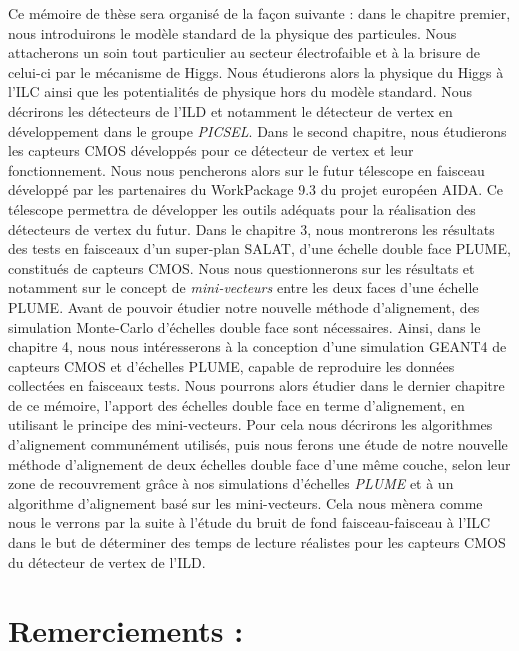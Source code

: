 \documentclass[a4paper,11pt]{report}
\begin{document}
Ce m\'emoire de th\`ese sera organis\'e de la façon suivante : dans le chapitre premier, nous introduirons le mod\`ele standard de la physique des particules. Nous attacherons un soin tout particulier au secteur \'electrofaible et \`a la brisure de celui-ci par le m\'ecanisme de Higgs. Nous \'etudierons alors la physique du Higgs \`a l'ILC ainsi que les potentialit\'es de physique hors du mod\`ele standard. Nous d\'ecrirons les d\'etecteurs de l'ILD et notamment le d\'etecteur de vertex en développement dans le groupe \textit{PICSEL}. Dans le second chapitre, nous \'etudierons les capteurs CMOS d\'eveloppés pour ce d\'etecteur de vertex et leur fonctionnement. Nous nous pencherons alors sur le futur t\'elescope en faisceau d\'evelopp\'e par les partenaires du WorkPackage 9.3 du projet europ\'een AIDA. Ce t\'elescope permettra de développer les outils adéquats pour la r\'ealisation des d\'etecteurs de vertex du futur. Dans le chapitre 3, nous montrerons les résultats des tests en faisceaux d'un super-plan SALAT, d'une \'echelle double face PLUME, constitu\'es de capteurs CMOS. Nous nous questionnerons sur les r\'esultats et notamment sur le concept de \textit{mini-vecteurs} entre les deux faces d'une \'echelle PLUME. Avant de pouvoir \'etudier notre nouvelle m\'ethode d'alignement, des simulation Monte-Carlo d'\'echelles double face sont n\'ecessaires. Ainsi, dans le chapitre 4, nous nous int\'eresserons \`a la conception d'une simulation GEANT4 de capteurs CMOS et d'\'echelles PLUME, capable de reproduire les donn\'ees collect\'ees en faisceaux tests. Nous pourrons alors \'etudier dans le dernier chapitre de ce m\'emoire, l'apport des \'echelles double face en terme d'alignement, en utilisant le principe des mini-vecteurs. Pour cela nous d\'ecrirons les algorithmes d'alignement commun\'ement utilis\'es, puis nous ferons une \'etude de notre nouvelle m\'ethode d'alignement de deux \'echelles double face d'une m\^eme couche, selon leur zone de recouvrement grâce \`a nos simulations d'\'echelles \textit{PLUME} et \`a un algorithme d'alignement bas\'e sur les mini-vecteurs. Cela nous m\`enera comme nous le verrons par la suite \`a l'\'etude du bruit de fond faisceau-faisceau \`a l'ILC dans le but de d\'eterminer des temps de lecture r\'ealistes pour les capteurs CMOS du d\'etecteur de vertex de l'ILD.


\cleardoublepage
{}
\chapter*{Remerciements :}









%
\cleardoublepage
{}


\end{document}

